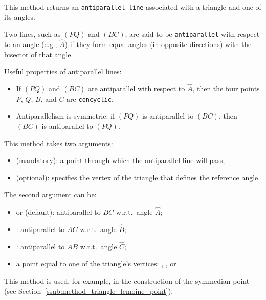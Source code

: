 This method returns an \texttt{antiparallel line} associated with a triangle and one of its angles.

Two lines, such as $(PQ)$ and $(BC)$, are said to be \texttt{antiparallel} with respect to an angle (e.g., $\hat{A}$) if they form equal angles (in opposite directions) with the bisector of that angle.


Useful properties of antiparallel lines:
\begin{itemize}
  \item If $(PQ)$ and $(BC)$ are antiparallel with respect to $\hat{A}$, then the four points $P$, $Q$, $B$, and $C$ are \texttt{concyclic}.
  \item Antiparallelism is symmetric: if $(PQ)$ is antiparallel to $(BC)$, then $(BC)$ is antiparallel to $(PQ)$.
\end{itemize}

\medskip

This method takes two arguments:
\begin{itemize}
  \item {} (mandatory): a point through which the antiparallel line will pass;
  \item {} (optional): specifies the vertex of the triangle that defines the reference angle.
\end{itemize}


The second argument  can be:
\begin{itemize}
  \item {} or  (default): antiparallel to $BC$ w.r.t.\ angle $\hat{A}$;
  \item {}: antiparallel to $AC$ w.r.t.\ angle $\hat{B}$;
  \item {}: antiparallel to $AB$ w.r.t.\ angle $\hat{C}$;
  \item a point equal to one of the triangle’s vertices: , , or .
\end{itemize}

\medskip

This method is used, for example, in the construction of the symmedian point (see Section~\ref{ssub:method_triangle_lemoine_point}).

\vspace{1em}
\begin{tkzexample}[latex =.5\textwidth]
\end{tkzexample}



